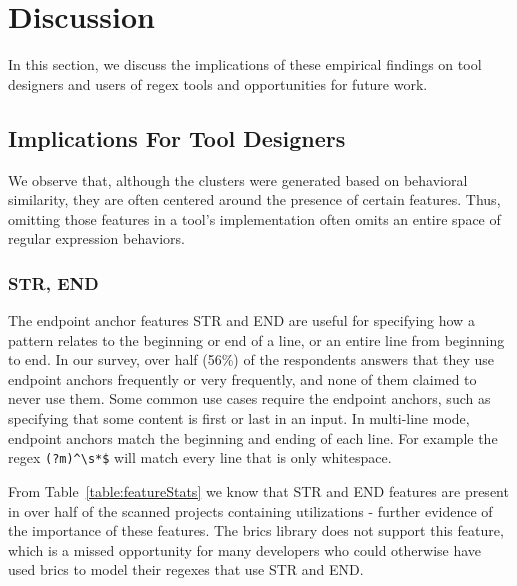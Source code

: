 \section{Discussion}
\label{sec:discussion}

In this section, we discuss the implications of these empirical findings on tool designers and users of regex tools and opportunities for future work.

\subsection{Implications For Tool Designers}

We observe that, although the clusters were generated based on behavioral similarity, they are often centered around the presence of certain features. Thus, omitting those features in a tool's implementation often omits an entire space of regular expression behaviors.

\subsubsection{STR, END}
The endpoint anchor features STR and END are useful for specifying how a pattern relates to the beginning or end of a line, or an entire line from beginning to end.  In our survey, over half (56\%) of the respondents answers that they use endpoint anchors frequently or very frequently, and none of them claimed to never use them.  Some common use cases require the endpoint anchors, such as specifying that some content is first or last in an input.  In multi-line mode, endpoint anchors match the beginning and ending of each line.  For example the regex \verb!(?m)^\s*$! will match every line that is only whitespace.

From Table~\ref{table:featureStats} we know that STR and END features are present in over half of the scanned projects containing utilizations - further evidence of the importance of these features.  The brics library does not support this feature, which is a missed opportunity for many developers who could otherwise have used brics to model their regexes that use STR and END.

